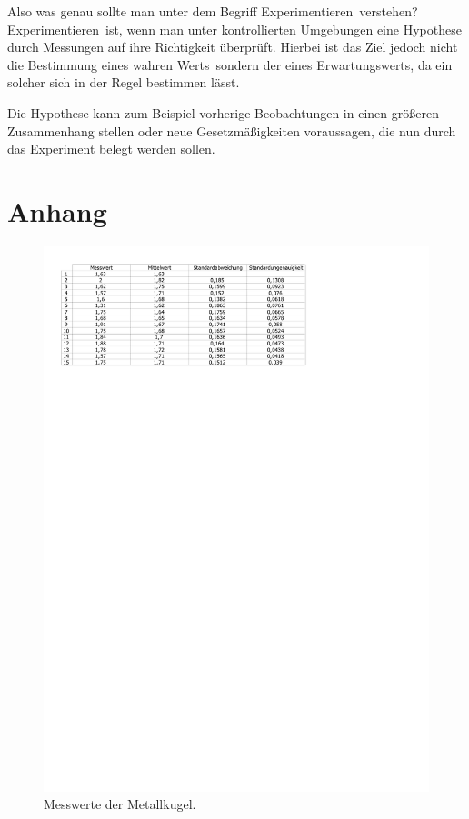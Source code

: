 \documentclass[11pt,a4paper,titlepage, ngerman]{article}
\begin{document}
		Also was genau sollte man unter dem Begriff \glqq Experimentieren\grqq\ verstehen? \\
		
		\glqq Experimentieren\grqq\ ist, wenn man unter kontrollierten Umgebungen eine Hypothese durch Messungen auf ihre Richtigkeit überprüft.
		Hierbei ist das Ziel jedoch nicht die Bestimmung eines \glqq wahren Werts\grqq\, sondern der eines Erwartungswerts, da ein solcher sich in der Regel bestimmen lässt.
	
		Die Hypothese kann zum Beispiel vorherige Beobachtungen in einen größeren Zusammenhang stellen oder neue Gesetzmäßigkeiten voraussagen, die nun durch das Experiment belegt werden sollen.
		
	\newpage
	\section{Anhang}
		\label{Anhang}
		\begin{figure}
			\includegraphics[scale=0.68]{Metallkugel.pdf}
			\caption{Messwerte der Metallkugel.}
		\end{figure}
\end{document}
